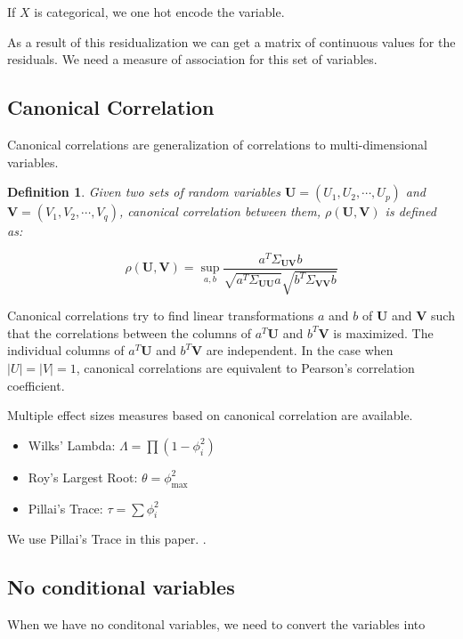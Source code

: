 \documentclass[letterpaper]{article} %
\newtheorem{definition}{Definition}
\begin{document}
If $ X $ is categorical, we one hot encode the variable.


As a result of this residualization we can get a matrix of continuous values for 
the residuals. We need a measure of association for this set of variables.

\subsection{Canonical Correlation}
Canonical correlations are generalization of correlations to multi-dimensional variables.

\begin{definition}
	Given two sets of random variables $ \bm{U} = (U_1, U_2, \cdots, U_p) $
	and $ \bm{V} = (V_1, V_2, \cdots, V_q) $, canonical correlation between
	them, $\rho(\bm{U}, \bm{V}) $ is defined as:
		
	\begin{equation}
		\rho(\bm{U}, \bm{V}) = \sup_{a, b} \frac{a^T \Sigma_{\bm{U}\bm{V}} b}{\sqrt{a^T \Sigma_{\bm{U}\bm{U}} a} \sqrt{b^T \Sigma_{\bm{V}\bm{V}} b}}
	\end{equation}

\end{definition}
	
	Canonical correlations try to find linear transformations $ a $ and $ b
	$ of $ \bm{U} $ and $ \bm{V} $ such that the correlations between the
	columns of $ a^T \bm{U} $ and $ b^T \bm{V} $ is maximized. The
	individual columns of $ a^T \bm{U} $ and $ b^T \bm{V} $ are
	independent. In the case when $ \rvert U \rvert = \rvert V \rvert = 1$,
	canonical correlations are equivalent to Pearson's correlation
	coefficient.

Multiple effect sizes measures based on canonical correlation are available.
\begin{itemize}
	\item Wilks' Lambda: $ \Lambda = \prod (1 - \phi_i^2) $
	\item Roy's Largest Root: $ \theta = \phi_{\max}^2 $
	\item Pillai's Trace: $ \tau = \sum \phi_i^2 $
\end{itemize}
We use Pillai's Trace in this paper. .

\subsection{No conditional variables}
When we have no conditonal variables, we need to convert the variables into 
\end{document}
